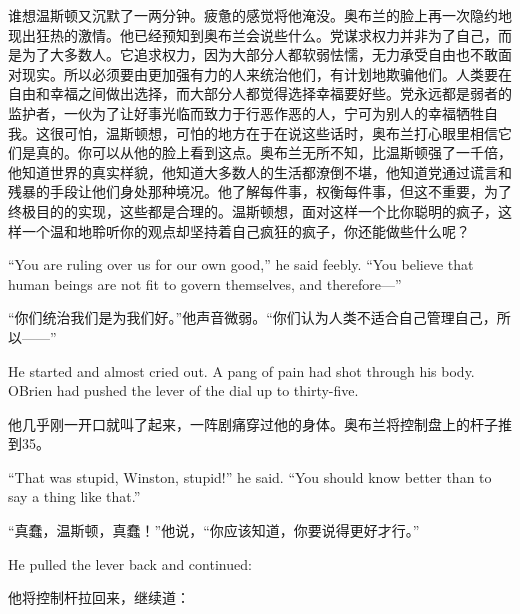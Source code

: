 \begin{paracol}{2}
\switchcolumn

谁想温斯顿又沉默了一两分钟。疲惫的感觉将他淹没。奥布兰的脸上再一次隐约地现出狂热的激情。他已经预知到奥布兰会说些什么。党谋求权力并非为了自己，而是为了大多数人。它追求权力，因为大部分人都软弱怯懦，无力承受自由也不敢面对现实。所以必须要由更加强有力的人来统治他们，有计划地欺骗他们。人类要在自由和幸福之间做出选择，而大部分人都觉得选择幸福要好些。党永远都是弱者的监护者，一伙为了让好事光临而致力于行恶作恶的人，宁可为别人的幸福牺牲自我。这很可怕，温斯顿想，可怕的地方在于在说这些话时，奥布兰打心眼里相信它们是真的。你可以从他的脸上看到这点。奥布兰无所不知，比温斯顿强了一千倍，他知道世界的真实样貌，他知道大多数人的生活都潦倒不堪，他知道党通过谎言和残暴的手段让他们身处那种境况。他了解每件事，权衡每件事，但这不重要，为了终极目的的实现，这些都是合理的。温斯顿想，面对这样一个比你聪明的疯子，这样一个温和地聆听你的观点却坚持着自己疯狂的疯子，你还能做些什么呢？

\switchcolumn*

``You are ruling over us for our own good,'' he said feebly. ``You believe
that human beings are not fit to govern themselves, and therefore---''

\switchcolumn

``你们统治我们是为我们好。''他声音微弱。``你们认为人类不适合自己管理自己，所
以——''

\switchcolumn*

He started and almost cried out. A pang of pain had shot through his
body. O\textquotesingle Brien had pushed the lever of the dial up to
thirty-five.

\switchcolumn

他几乎刚一开口就叫了起来，一阵剧痛穿过他的身体。奥布兰将控制盘上的杆子推到35。

\switchcolumn*

``That was stupid, Winston, stupid!'' he said. ``You should know better
than to say a thing like that.''

\switchcolumn

``真蠢，温斯顿，真蠢！''他说，``你应该知道，你要说得更好才行。''

\switchcolumn*

He pulled the lever back and continued:

\switchcolumn

他将控制杆拉回来，继续道：

\switchcolumn*


\end{paracol}
